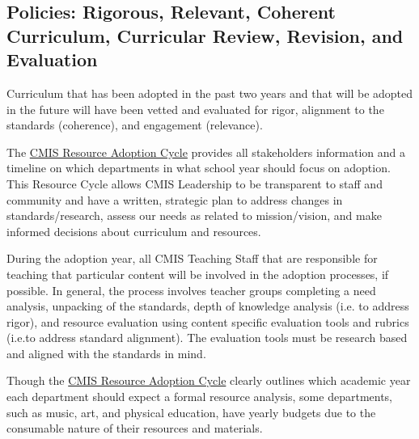 \documentclass{report}
\begin{document}
\subsection{Policies: Rigorous, Relevant, Coherent Curriculum, Curricular Review, Revision, and Evaluation}



\begin{findings}
Curriculum that has been adopted in the past two years and that will be adopted in the future will have been vetted and evaluated for rigor, alignment to the standards (coherence), and engagement (relevance). 


The \href{https://docs.google.com/a/cmis.ac.th/document/d/1hh1nLUlJgg1hd7s6aG3u3We0L6o7Wg_ECdjc2f6DcT8/edit?usp=sharing}{CMIS Resource Adoption Cycle} provides all stakeholders information and a timeline on which departments in what school year should focus on adoption. This Resource Cycle allows CMIS Leadership to be transparent to staff and community and have a written, strategic plan to address changes in standards/research, assess our needs as related to mission/vision, and make informed decisions about curriculum and resources. 

During the adoption year, all CMIS Teaching Staff that are responsible for teaching that particular content will be involved in the adoption processes, if possible. In general, the process involves teacher groups completing a need analysis, unpacking of the standards, depth of knowledge analysis (i.e. to address rigor), and resource evaluation using content specific evaluation tools and rubrics (i.e.to address standard alignment). The evaluation tools must be research based and aligned with the standards in mind. 

Though the \href{https://docs.google.com/a/cmis.ac.th/document/d/1hh1nLUlJgg1hd7s6aG3u3We0L6o7Wg_ECdjc2f6DcT8/edit?usp=sharing}{CMIS Resource Adoption Cycle} clearly outlines which academic year each department should expect a formal resource analysis, some departments, such as music, art, and physical education, have yearly budgets due to the consumable nature of their resources and materials. 


\end{findings}
\end{document}
